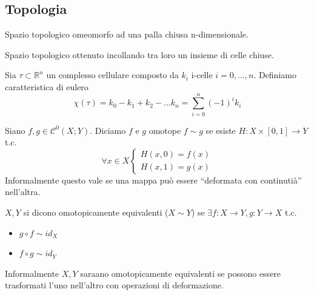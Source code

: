 \subsection{Topologia}
\begin{definizione}
    Spazio topologico omeomorfo ad una palla chiusa n-dimensionale.
\end{definizione}
\begin{definizione}
    Spazio topologico ottenuto incollando tra loro un insieme di celle chiuse.
\end{definizione}
\begin{definizione}
    Sia \(\tau \subset \mathbb{R}^n\) un complesso cellulare composto da \(k_i\) i-celle \(i=0,\dots,n\). Definiamo caratteristica di eulero
    \begin{equation}
        \chi(\tau) = k_0 - k_1 + k_2 - \dots k_n = \sum_{i=0}^{n}{(-1)}^i k_i
    \end{equation}
\end{definizione}

\begin{definizione}
    Siano \(f,g \in \mathcal{C}^0(X;Y)\). Diciamo \(f\) e \(g\) omotope \(f \sim g\) se esiste \(H : X \times [0,1] \to Y\) t.c.
    \begin{equation}
        \forall x \in X \begin{cases}
            H(x,0)=f(x) \\
            H(x,1)=g(x)
        \end{cases}
    \end{equation}
    Informalmente questo vale se una mappa può essere “deformata con continutià” nell'altra.
\end{definizione}

\begin{definizione}
    \(X,Y\) si dicono omotopicamente equivalenti (\(X\sim Y\)) se \(\exists f : X \to Y, g:Y \to X \) t.c.
    \begin{itemize}
        \item \(g \circ f \sim id_X\)
        \item \(f \circ g \sim id_Y\)
    \end{itemize}
    Informalmente \(X,Y\) saraano omotopicamente equivalenti se possono essere trasformati l'uno nell'altro con operazioni di deformazione.
\end{definizione}

